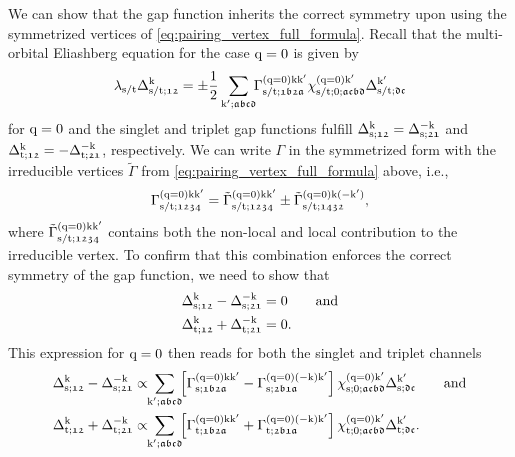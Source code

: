 \documentclass[\main/main.tex]{subfiles}
\begin{document}
We can show that the gap function inherits the correct symmetry upon using the symmetrized vertices of \eqref{eq:pairing_vertex_full_formula}. Recall that the multi-orbital Eliashberg equation for the case $\text{q}=0$ is given by 
\begin{align}
	\lambda_{\text{s}/\text{t}}\Delta_{\text{s}/\text{t};\mathfrak{12}}^{\text{k}}=\pm\frac{1}{2}\sum_{\text{k}';\mathfrak{abcd}}\!\!\Gamma^{(\text{q}=0)\text{k}\text{k}'}_{\text{s}/\text{t};\mathfrak{1b2a}}\chi^{(\text{q}=0)\text{k}'}_{\text{s}/\text{t};0;\mathfrak{acbd}}\Delta_{\text{s}/\text{t};\mathfrak{dc}}^{\text{k}'}
\end{align}
for $\text{q}=0$ and the singlet and triplet gap functions fulfill $\Delta_{\text{s};\mathfrak{12}}^{\text{k}}=\Delta_{\text{s};\mathfrak{21}}^{-\text{k}}$ and $\Delta_{\text{t};\mathfrak{12}}^{\text{k}}=-\Delta_{\text{t};\mathfrak{21}}^{-\text{k}}$, respectively. We can write $\Gamma$ in the symmetrized form with the irreducible vertices $\tilde{\Gamma}$ from \eqref{eq:pairing_vertex_full_formula} above, i.e.,
\begin{align}\label{eq:symmetrization_pairing_vertex}
	\Gamma^{(\text{q}=0)\text{k}\text{k}'}_{\text{s}/\text{t};\mathfrak{1234}} = \tilde{\Gamma}^{(\text{q}=0)\text{k}\text{k}'}_{\text{s}/\text{t};\mathfrak{1234}}\pm \tilde{\Gamma}^{(\text{q}=0)\text{k}(-\text{k}')}_{\text{s}/\text{t};\mathfrak{1432}},
\end{align}
where $\tilde{\Gamma}^{(\text{q}=0)\text{k}\text{k}'}_{\text{s}/\text{t};\mathfrak{1234}}$ contains both the non-local and local contribution to the irreducible vertex. To confirm that this combination enforces the correct symmetry of the gap function, we need to show that
\begin{subequations}
\begin{align}
	\Delta_{\text{s};\mathfrak{12}}^{\text{k}}-\Delta_{\text{s};\mathfrak{21}}^{-\text{k}}&=0\qquad\text{and}\\
	\Delta_{\text{t};\mathfrak{12}}^{\text{k}}+\Delta_{\text{t};\mathfrak{21}}^{-\text{k}}&=0.
\end{align}
\end{subequations}
This expression for $\text{q}=0$ then reads for both the singlet and triplet channels
\begin{subequations}
\begin{align}
	\Delta_{\sing;\mathfrak{12}}^{\k}-\Delta_{\sing;\mathfrak{21}}^{-\k}&\propto\!\!\sum_{\kp;\mathfrak{abcd}}\!\! \left [\Gamma^{(\q=0)\k\kp}_{\sing;\mathfrak{1b2a}}-\Gamma^{(\q=0)(-\k)\kp}_{\sing;\mathfrak{2b1a}}\right ]\chi^{(\q=0)\kp}_{\sing;0;\mathfrak{acbd}}\Delta_{\sing;\mathfrak{dc}}^{\kp}\label{eq:symmetrization_delta_first_formula_singlet}\qqand\\
	\Delta_{\trip;\mathfrak{12}}^{\k}+\Delta_{\trip;\mathfrak{21}}^{-\k}&\propto\!\!\sum_{\kp;\mathfrak{abcd}}\!\! \left [\Gamma^{(\q=0)\k\kp}_{\trip;\mathfrak{1b2a}}+\Gamma^{(\q=0)(-\k)\kp}_{\trip;\mathfrak{2b1a}}\right ]\chi^{(\q=0)\kp}_{\trip;0;\mathfrak{acbd}}\Delta_{\trip;\mathfrak{dc}}^{\kp}\label{eq:symmetrization_delta_first_formula_triplet}.
\end{align}
\end{subequations}
\end{document}
